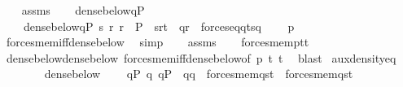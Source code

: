 \begin{isabellebody}
\ \ \isamarkupfalse%
\ assms\isanewline
\ \ \isamarkupfalse%
\ {\isachardoublequoteopen}dense{\isacharunderscore}{\kern0pt}below{\isacharparenleft}{\kern0pt}{\isacharbraceleft}{\kern0pt}q{\isasymin}P{\isachardot}{\kern0pt}\ \isanewline
\ \ \ \ dense{\isacharunderscore}{\kern0pt}below{\isacharparenleft}{\kern0pt}{\isacharbraceleft}{\kern0pt}q{\isacharprime}{\kern0pt}{\isasymin}P{\isachardot}{\kern0pt}\ {\isasymexists}s\ r{\isachardot}{\kern0pt}\ r\ {\isasymin}\ P\ {\isasymand}\ {\isasymlangle}s{\isacharcomma}{\kern0pt}r{\isasymrangle}{\isasymin}t{}\ {\isasymand}\ q{\isacharprime}{\kern0pt}{\isasympreceq}r\ {\isasymand}\ forces{\isacharunderscore}{\kern0pt}eq{\isacharparenleft}{\kern0pt}q{\isacharprime}{\kern0pt}{\isacharcomma}{\kern0pt}t{}{\isacharcomma}{\kern0pt}s{\isacharparenright}{\kern0pt}{\isacharbraceright}{\kern0pt}{\isacharcomma}{\kern0pt}q{\isacharparenright}{\kern0pt}\isanewline
\ \ \ \ {\isacharbraceright}{\kern0pt}{\isacharcomma}{\kern0pt}p{\isacharparenright}{\kern0pt}{\isachardoublequoteclose}\isanewline
\ \ \ \ \isamarkupfalse%
\ forces{\isacharunderscore}{\kern0pt}mem{\isacharunderscore}{\kern0pt}iff{\isacharunderscore}{\kern0pt}dense{\isacharunderscore}{\kern0pt}below\ \isamarkupfalse%
\ simp\isanewline
\ \ \isamarkupfalse%
\ assms\isanewline
\ \ \isamarkupfalse%
\ {\isachardoublequoteopen}forces{\isacharunderscore}{\kern0pt}mem{\isacharparenleft}{\kern0pt}p{\isacharcomma}{\kern0pt}t{}{\isacharcomma}{\kern0pt}t{}{\isacharparenright}{\kern0pt}{\isachardoublequoteclose}\isanewline
\ \ \ \ \isamarkupfalse%
\ dense{\isacharunderscore}{\kern0pt}below{\isacharunderscore}{\kern0pt}dense{\isacharunderscore}{\kern0pt}below\ forces{\isacharunderscore}{\kern0pt}mem{\isacharunderscore}{\kern0pt}iff{\isacharunderscore}{\kern0pt}dense{\isacharunderscore}{\kern0pt}below{\isacharbrackleft}{\kern0pt}of\ p\ t{}\ t{}{\isacharbrackright}{\kern0pt}\ \isamarkupfalse%
\ blast\isanewline
{}\isamarkupfalse%
%
\endisatagproof
{\isafoldproof}%
%
\isadelimproof
\isanewline
%
\endisadelimproof
\isanewline
{}\isamarkupfalse%
\ aux{\isacharunderscore}{\kern0pt}density{\isacharunderscore}{\kern0pt}eq{\isacharcolon}{\kern0pt}\isanewline
\ \ \ \isanewline
\ \ \ \ {\isachardoublequoteopen}dense{\isacharunderscore}{\kern0pt}below{\isacharparenleft}{\kern0pt}\isanewline
\ \ \ \ {\isacharbraceleft}{\kern0pt}q{\isacharprime}{\kern0pt}{\isasymin}P{\isachardot}{\kern0pt}\ {\isasymforall}q{\isachardot}{\kern0pt}\ q{\isasymin}P\ {\isasymand}\ q{\isasympreceq}q{\isacharprime}{\kern0pt}\ {\isasymlongrightarrow}\ forces{\isacharunderscore}{\kern0pt}mem{\isacharparenleft}{\kern0pt}q{\isacharcomma}{\kern0pt}s{\isacharcomma}{\kern0pt}t{}{\isacharparenright}{\kern0pt}\ {\isasymlongleftrightarrow}\ forces{\isacharunderscore}{\kern0pt}mem{\isacharparenleft}{\kern0pt}q{\isacharcomma}{\kern0pt}s{\isacharcomma}{\kern0pt}t{}{\isacharparenright}{\kern0pt}{\isacharbraceright}{\kern0pt}\isanewline

\end{isabellebody}
